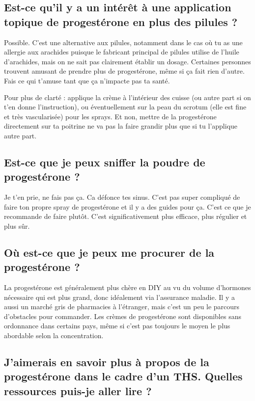 \documentclass{article}
\begin{document}
\subsection{Est-ce qu'il y a un intérêt à une application topique de progestérone en plus des pilules ?}

Possible. C'est une alternative aux pilules, notamment dans le cas où tu as une allergie aux arachides puisque le fabricant principal de pilules utilise de l'huile d'arachides, mais on ne sait pas clairement établir un dosage. Certaines personnes trouvent amusant de prendre plus de progestérone, même si ça fait rien d'autre. Fais ce qui t'amuse tant que ça n'impacte pas ta santé.

Pour plus de clarté : applique la crème à l'intérieur des cuisse (ou autre part si on t'en donne l'instruction), ou éventuellement sur la peau du scrotum (elle est fine et très vascularisée) pour les sprays. Et non, mettre de la progestérone directement sur ta poitrine ne va pas la faire grandir plus que si tu l'applique autre part.

\subsection{Est-ce que je peux sniffer la poudre de progestérone ?}

Je t'en prie, ne fais pas ça. Ca défonce tes sinus. C'est pas super compliqué de faire ton propre spray de progestérone et il y a des guides pour ça. C'est ce que je recommande de faire plutôt. C'est significativement plus efficace, plus régulier et plus sûr.

\subsection{Où est-ce que je peux me procurer de la progestérone ?}

La progestérone est généralement plus chère en DIY au vu du volume d'hormones nécessaire qui est plus grand, donc idéalement via l'assurance maladie. Il y a aussi un marché gris de pharmacies à l'étranger, mais c'est un peu le parcours d'obstacles pour commander. Les crèmes de progestérone sont disponibles sans ordonnance dans certains pays, même si c'est pas toujours le moyen le plus abordable selon la concentration.

\subsection{J'aimerais en savoir plus à propos de la progestérone dans le cadre d'un THS. Quelles ressources puis-je aller lire ?}\label{8-17}
\end{document}
